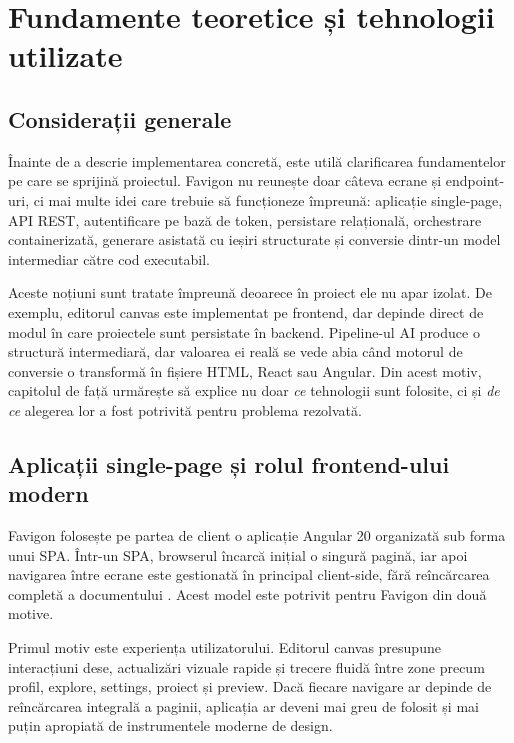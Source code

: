 \chapter{Fundamente teoretice și tehnologii utilizate}

\section{Considerații generale}

Înainte de a descrie implementarea concretă, este utilă clarificarea fundamentelor pe care se sprijină proiectul. Favigon nu reunește doar câteva ecrane și endpoint-uri, ci mai multe idei care trebuie să funcționeze împreună: aplicație single-page, API REST, autentificare pe bază de token, persistare relațională, orchestrare containerizată, generare asistată cu ieșiri structurate și conversie dintr-un model intermediar către cod executabil.

Aceste noțiuni sunt tratate împreună deoarece în proiect ele nu apar izolat. De exemplu, editorul canvas este implementat pe frontend, dar depinde direct de modul în care proiectele sunt persistate în backend. Pipeline-ul AI produce o structură intermediară, dar valoarea ei reală se vede abia când motorul de conversie o transformă în fișiere HTML, React sau Angular. Din acest motiv, capitolul de față urmărește să explice nu doar \textit{ce} tehnologii sunt folosite, ci și \textit{de ce} alegerea lor a fost potrivită pentru problema rezolvată.

\section{Aplicații single-page și rolul frontend-ului modern}

Favigon folosește pe partea de client o aplicație Angular 20 organizată sub forma unui SPA. Într-un SPA, browserul încarcă inițial o singură pagină, iar apoi navigarea între ecrane este gestionată în principal client-side, fără reîncărcarea completă a documentului \cite{angularDocs2026}. Acest model este potrivit pentru Favigon din două motive.

Primul motiv este experiența utilizatorului. Editorul canvas presupune interacțiuni dese, actualizări vizuale rapide și trecere fluidă între zone precum profil, explore, settings, proiect și preview. Dacă fiecare navigare ar depinde de reîncărcarea integrală a paginii, aplicația ar deveni mai greu de folosit și mai puțin apropiată de instrumentele moderne de design.


